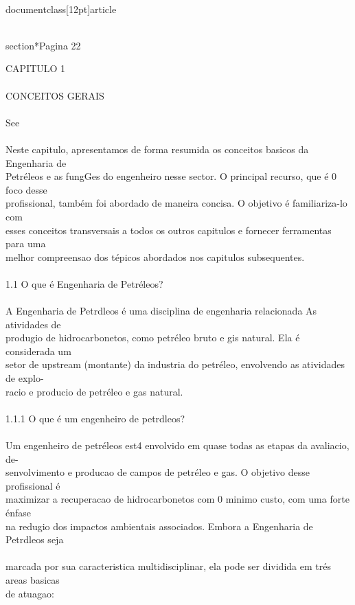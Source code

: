 \\documentclass[12pt]{article}
\begin{document}
{\\section*{Pagina 22}

CAPITULO 1\\
\\
CONCEITOS GERAIS\\
\\
See\\
\\
Neste capitulo, apresentamos de forma resumida os conceitos basicos da Engenharia de\\
Petréleos e as fungGes do engenheiro nesse sector. O principal recurso, que é 0 foco desse\\
profissional, também foi abordado de maneira concisa. O objetivo é familiariza-lo com\\
esses conceitos transversais a todos os outros capitulos e fornecer ferramentas para uma\\
melhor compreensao dos tépicos abordados nos capitulos subsequentes.\\
\\
1.1 O que é Engenharia de Petréleos?\\
\\
A Engenharia de Petrdleos é uma disciplina de engenharia relacionada As atividades de\\
produgio de hidrocarbonetos, como petréleo bruto e gis natural. Ela é considerada um\\
setor de upstream (montante) da industria do petréleo, envolvendo as atividades de explo-\\
racio e producio de petréleo e gas natural.\\
\\
1.1.1 O que é um engenheiro de petrdleos?\\
\\
Um engenheiro de petréleos est4 envolvido em quase todas as etapas da avaliacio, de-\\
senvolvimento e producao de campos de petréleo e gas. O objetivo desse profissional é\\
maximizar a recuperacao de hidrocarbonetos com 0 minimo custo, com uma forte énfase\\
na redugio dos impactos ambientais associados. Embora a Engenharia de Petrdleos seja\\
\\
marcada por sua caracteristica multidisciplinar, ela pode ser dividida em trés areas basicas\\
de atuagao:\\
\\
}
\end{document}
